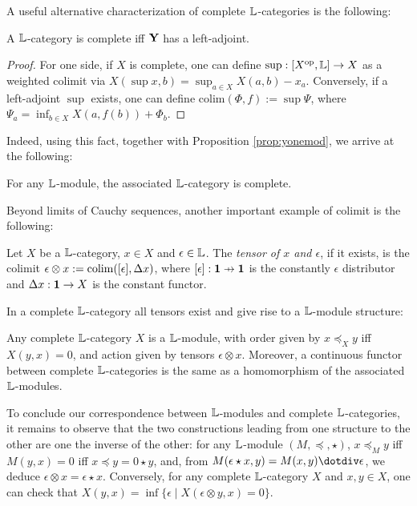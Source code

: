 A useful alternative characterization of complete $\mathbb{L}$-categories is the following:
\begin{proposition}
A $\mathbb{L}$-category is complete iff $\mathbf{Y}$ has a left-adjoint. 
\end{proposition}
\begin{proof}
For one side, if $X$ is complete, one can define $\sup : [X^{\mathrm{op}},\mathbb{L}]\to X$ as a weighted colimit via $X(\sup x,b)=\sup_{a\in X}
X(a,b)-x_{a}$. Conversely, if a left-adjoint $\sup $ exists, one can define $\mathrm{colim}(\Phi,f):= \sup \Psi$, where $\Psi_{a}=\inf_{b\in X}X(a,f(b))+\Phi_{b}$. 
\end{proof}

Indeed, using this fact, together with Proposition \ref{prop:yonemod}, we arrive at the following:
\begin{proposition}
For any $\mathbb{L}$-module, the associated $\mathbb{L}$-category is complete. 
\end{proposition}

Beyond limits of Cauchy sequences, another important example of colimit is the following:
\begin{definition}
Let $X$ be a $\mathbb{L}$-category, $x\in X$ and $\epsilon \in \mathbb{L}$. The \emph{tensor of $x$ and $\epsilon$}, if it exists, is the colimit $\epsilon \otimes x:= \mathrm{colim}( [\epsilon],\Delta x)$, where
$[\epsilon]: \B 1\pfun \B 1$ is the constantly $\epsilon$ distributor
and $\Delta x:\mathbf{1}\to X$ is the constant functor. 
\end{definition}

In a complete $\mathbb{L}$-category all tensors exist and give rise to a $\mathbb{L}$-module structure:
\begin{proposition}
Any complete $\mathbb{L}$-category $X$ is a $\mathbb{L}$-module, with order given by $x\preceq_{X}y $ iff $X(y,x)=0$, and 
action given by tensors $\epsilon \otimes x$. Moreover, a continuous functor between complete $\mathbb{L}$-categories is the same as a homomorphism of the associated $\mathbb{L}$-modules. 
\end{proposition}


To conclude our correspondence between $\mathbb{L}$-modules and complete $\mathbb{L}$-categories, it remains to observe that the 
two constructions leading from one structure to the other are one the inverse of the other: for any $\mathbb{L}$-module $(M,\preceq,\star)$,
$x\preceq_{M}y$ iff $M(y,x)=0$ iff $x\preceq y=0\star y$, and, from  
$M(\epsilon \star x, y)= M(x,y)\dotdiv \epsilon$, we deduce $\epsilon\otimes x=\epsilon \star x$. 
Conversely, 
for any complete $\mathbb{L}$-category $X$ and $x,y\in X$, one can check that 
$X(y,x)=\inf\{ \epsilon \mid X(\epsilon\otimes y,x )=0\}$.


